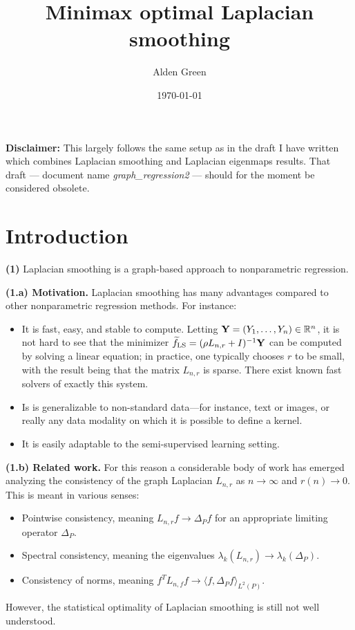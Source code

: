 \documentclass{article}
\newcommand{\Reals}{\mathbb{R}}
\newcommand{\1}{\mathbf{1}}
\newcommand{\Lap}{L}
\newcommand{\Leb}{L}
\newcommand{\wt}[1]{\widetilde{#1}}
\newcommand{\LS}{\mathrm{LS}}
\theoremstyle{alden}
\theoremstyle{aldenthm}
\theoremstyle{definition}
\theoremstyle{remark}
\begin{document}
\title{Minimax optimal Laplacian smoothing}
\author{Alden Green}
\date{\today}
\maketitle

\textbf{Disclaimer:} This largely follows the same setup as in the draft I have written which combines Laplacian smoothing and Laplacian eigenmaps results. That draft --- document name \textit{graph\_regression2} --- should for the moment be considered obsolete.

\section{Introduction}

\textbf{(1)} Laplacian smoothing is a graph-based approach to nonparametric regression. 

\textbf{(1.a) Motivation.} Laplacian smoothing has many advantages compared to other nonparametric regression methods. For instance:

\begin{itemize}
	\item It is fast, easy, and stable to compute. Letting ${\bf Y} = (Y_1,\ldots,Y_n) \in \Reals^n$, it is not hard to see that the minimizer $\wt{f}_{\LS} = (\rho \Lap_{n,r} + I)^{-1}{\bf Y}$ can be computed by solving a linear equation; in practice, one typically chooses $r$ to be small, with the result being that the matrix $\Lap_{n,r}$ is sparse. There exist known fast solvers of exactly this system.
	\item Is is generalizable to non-standard data---for instance, text or images, or really any data modality on which it is possible to define a kernel.
	\item It is easily adaptable to the semi-supervised learning setting. 
\end{itemize}

\textbf{(1.b) Related work.} For this reason a considerable body of work has emerged analyzing the consistency of the graph Laplacian $\Lap_{{n,r}}$ as $n \to \infty$ and $r(n) \to 0$. This is meant in various senses:
\begin{itemize}
	\item Pointwise consistency, meaning $\Lap_{n,r}f \to \Delta_Pf$ for an appropriate limiting operator $\Delta_P$.
	\item Spectral consistency, meaning the eigenvalues $\lambda_k(\Lap_{n,r}) \to \lambda_k(\Delta_P)$.
	\item Consistency of norms, meaning $f^T \Lap_{n,f} f \to \langle f,\Delta_Pf \rangle_{\Leb^2(P)}$. 
\end{itemize}
However, the statistical optimality of Laplacian smoothing is still not well understood.
\end{document}
